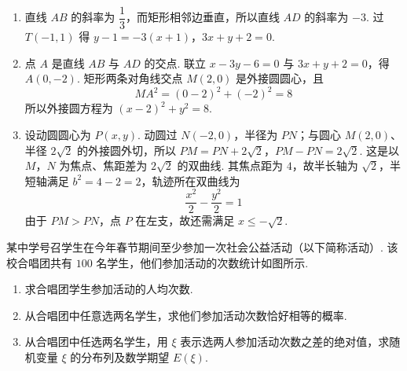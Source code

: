 \begin{solution}
\begin{enumerate}
\item 直线 \(AB\) 的斜率为 \(\dfrac13\)，而矩形相邻边垂直，所以直线 \(AD\) 的斜率为 \(-3\). 过 \(T(-1,1)\) 得
\(y-1=-3(x+1)\)，\(3x+y+2=0\).
\item 点 \(A\) 是直线 \(AB\) 与 \(AD\) 的交点. 联立
\(x-3y-6=0\) 与 \(3x+y+2=0\)，得 \(A(0,-2)\). 矩形两条对角线交点 \(M(2,0)\) 是外接圆圆心，且
\[
MA^2=(0-2)^2+(-2)^2=8
\]
所以外接圆方程为 \((x-2)^2+y^2=8\).
\item 设动圆圆心为 \(P(x,y)\). 动圆过 \(N(-2,0)\)，半径为 \(PN\)；与圆心 \(M(2,0)\)、半径 \(2\sqrt2\) 的外接圆外切，所以
\(PM=PN+2\sqrt2\)，\(PM-PN=2\sqrt2\).
这是以 \(M\)，\(N\) 为焦点、焦距差为 \(2\sqrt2\) 的双曲线. 其焦点距为 \(4\)，故半长轴为 \(\sqrt2\)，半短轴满足 \(b^2=4-2=2\)，轨迹所在双曲线为
\[
\frac{x^2}{2}-\frac{y^2}{2}=1
\]
由于 \(PM>PN\)，点 \(P\) 在左支，故还需满足 \(x\leqslant-\sqrt2\).
\end{enumerate}
\end{solution}

\begin{problem}
某中学号召学生在今年春节期间至少参加一次社会公益活动（以下简称活动）. 该校合唱团共有 \(100\) 名学生，他们参加活动的次数统计如图所示.

\begin{enumerate}
\item 求合唱团学生参加活动的人均次数.
\item 从合唱团中任意选两名学生，求他们参加活动次数恰好相等的概率.
\item 从合唱团中任选两名学生，用 \(\xi\) 表示选两人参加活动次数之差的绝对值，求随机变量 \(\xi\) 的分布列及数学期望 \(E(\xi)\).
\end{enumerate}

\end{problem}

